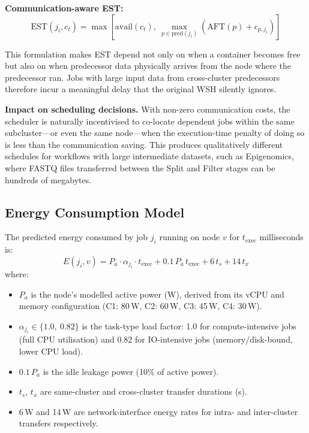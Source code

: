 \documentclass[10pt,twocolumn]{article}
\begin{document}
\noindent\textbf{Communication-aware EST:}
\begin{equation}
    \text{EST}(j_i, c_t) = \max\!\left[\text{avail}(c_t),\
    \max_{p \in \text{pred}(j_i)}\!\left(\text{AFT}(p) + c_{p,j_i}\right)\right]
    \label{eq:ext_est}
\end{equation}

This formulation makes EST depend not only on when a container becomes free but
also on when predecessor data physically arrives from the node where the predecessor
ran. Jobs with large input data from cross-cluster predecessors therefore incur a
meaningful delay that the original WSH silently ignores.

\textbf{Impact on scheduling decisions.}
With non-zero communication costs, the scheduler is naturally incentivised to
co-locate dependent jobs within the same subcluster---or even the same node---when
the execution-time penalty of doing so is less than the communication saving. This
produces qualitatively different schedules for workflows with large intermediate
datasets, such as Epigenomics, where FASTQ files transferred between the Split and
Filter stages can be hundreds of megabytes.

\subsection{Energy Consumption Model}

The predicted energy consumed by job $j_i$ running on node $v$ for $t_{\text{exec}}$
milliseconds is:
\begin{equation}
    E(j_i, v) = P_{a} \cdot \alpha_{j_i} \cdot t_{\text{exec}}
                + 0.1\,P_{a}\,t_{\text{exec}}
                + 6\,t_s + 14\,t_x
    \label{eq:energy}
\end{equation}
where:
\begin{itemize}[leftmargin=1.4cm,nosep]
  \item $P_{a}$ is the node's modelled active power (W), derived from its vCPU and
        memory configuration (C1: 80\,W, C2: 60\,W, C3: 45\,W, C4: 30\,W).
  \item $\alpha_{j_i} \in \{1.0,\ 0.82\}$ is the task-type load factor: 1.0 for
        compute-intensive jobs (full CPU utilisation) and 0.82 for IO-intensive
        jobs (memory/disk-bound, lower CPU load).
  \item $0.1\,P_{a}$ is the idle leakage power (10\% of active power).
  \item $t_s$, $t_x$ are same-cluster and cross-cluster transfer durations (s).
  \item 6\,W and 14\,W are network-interface energy rates for intra- and
        inter-cluster transfers respectively.
\end{itemize}
\end{document}
